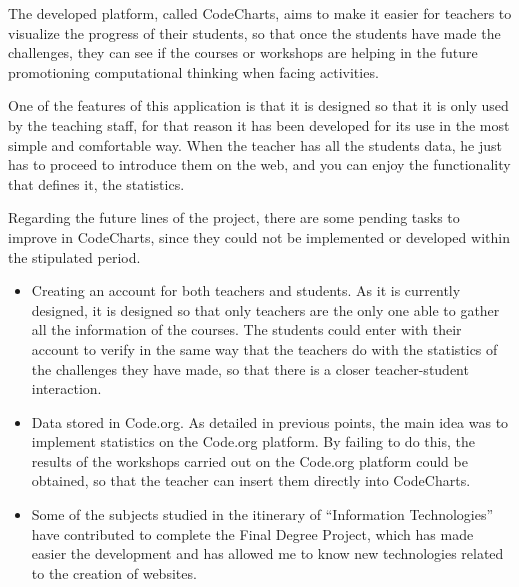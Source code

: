 

The developed platform, called CodeCharts, aims to make it easier for teachers to visualize the progress of their students, so that once the students have made the challenges, they can see if the courses or workshops are helping in the future promotioning computational thinking when facing activities.

One of the features of this application is that it is designed so that it is only used by the teaching staff, for that reason it has been developed for its use in the most simple and comfortable way. When the teacher has all the students data, he just has to proceed to introduce them on the web, and you can enjoy the functionality that defines it, the statistics.

Regarding the future lines of the project, there are some pending tasks to improve in CodeCharts, since they could not be implemented or developed within the stipulated period.

\begin{itemize}
    \item Creating an account for both teachers and students. As it is currently designed, it is designed so that only teachers are the only one able to gather all the information of the courses. The students could enter with their account to verify in the same way that the teachers do with the statistics of the challenges they have made, so that there is a closer teacher-student interaction.
    \item Data stored in Code.org. As detailed in previous points, the main idea was to implement statistics on the Code.org platform. By failing to do this, the results of the workshops carried out on the Code.org platform could be obtained, so that the teacher can insert them directly into CodeCharts.
    \item Some of the subjects studied in the itinerary of ``Information Technologies'' have contributed to complete the Final Degree Project, which has made easier the development and has allowed me to know new technologies related to the creation of websites.
\end{itemize}


